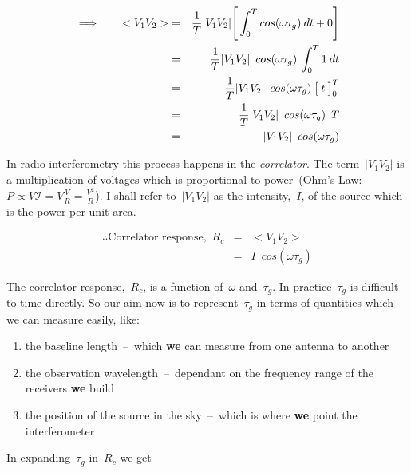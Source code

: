 \documentclass[11pt, a4paper]{article}
\newcommand{\msp}{\mkern \medmuskip}
\begin{document}
\begin{eqnarray}
  \label{eq:5}
  \implies \qquad <V_1V_2> &=& \frac{1}{T} |V_1V_2| \Bigg [\int _0^T cos(\omega \tau _g) \msp dt + 0 \Bigg ] \nonumber \\
           &=& \frac{1}{T} |V_1V_2| \enspace cos(\omega \tau _g) \msp \int _0^T 1 \msp dt \nonumber \\
           &=& \frac{1}{T} |V_1V_2| \enspace cos(\omega \tau _g) \msp \big[\msp t \msp \big]_0^T \nonumber \\
           &=& \frac{1}{T} |V_1V_2| \enspace cos(\omega \tau _g) \enspace T \nonumber \\
           &=& |V_1V_2| \enspace cos(\omega \tau _g)
\end{eqnarray}

In radio interferometry this process happens in the \emph{correlator}. The term~$|V_1V_2|$ is a multiplication of voltages which is proportional to power~(Ohm's Law: $P \propto V\mathcal{I} = V\frac{V}{R} = \frac{V^2}{R}$). I shall refer to~$|V_1V_2|$ as the intensity,~$I$, of the source which is the power per unit area.

\begin{eqnarray}
  \label{eq:6}
  \therefore \mbox{Correlator response,} \enspace R_c &=& <V_1V_2> \nonumber \\
                                                      &=& I \enspace cos(\omega \tau _g)
\end{eqnarray}

The correlator response,~$R_c$, is a function of~$\omega $ and~$\tau _g$. In practice~$\tau _g$ is difficult to time directly. So our aim now is to represent~$\tau _g$ in terms of quantities which we can measure easily, like:

\begin{enumerate}
  \itemsep-0.5cm
\item the baseline length~--~which \textbf{we} can measure from one antenna to another \\
\item the observation wavelength~--~dependant on the frequency range of the receivers \textbf{we} build \\
\item the position of the source in the sky~--~which is where \textbf{we} point the interferometer
\end{enumerate}

In expanding~$\tau _g$ in~$R_c$ we get
\end{document}
